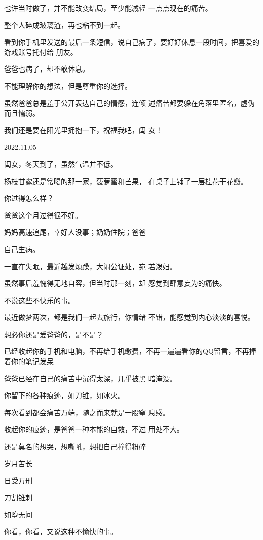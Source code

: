 \documentclass{article}
\begin{document}
也许当时做了，并不能改变结局，至少能减轻
一点点现在的痛苦。 


整个人碎成玻璃渣，再也粘不到一起。 

看到你手机里发送的最后一条短信，说自己病了，要好好休息一段时间，把喜爱的游戏账号托付给
朋友。 


爸爸也病了，却不敢休息。 

\newpage


不能理解你的想法，但是尊重你的选择。 

虽然爸爸总是羞于公开表达自己的情感，连倾
述痛苦都要躲在角落里匿名，虚伪而且懦弱。 

我们还是要在阳光里拥抱一下，祝福我吧，闺
女！ 



2022.11.05 


闺女，冬天到了，虽然气温并不低。 

杨枝甘露还是常喝的那一家，菠萝蜜和芒果，
在桌子上铺了一层桂花干花瓣。 


你过得怎么样？ 


爸爸这个月过得很不好。 

妈妈高速追尾，幸好人没事；奶奶住院；爸爸
\newpage

自己生病。 

一直在失眠，最近越发烦躁，大闹公证处，宛
若泼妇。 

虽然事后羞愧得无地自容，但当时那一刻，却
感觉到肆意妄为的痛快。 


不说这些不快乐的事。 

最近做梦两次，都是我们一起去旅行，你情绪
不错，能感觉到内心淡淡的喜悦。 


想必你还是爱爸爸的，是不是？ 

已经收起你的手机和电脑，不再给手机缴费，不再一遍遍看你的QQ留言，不再捧着你的笔记发呆

爸爸已经在自己的痛苦中沉得太深，几乎被黑
暗淹没。 

\newpage


你留下的各种痕迹，如刀锥，如冰火。 

每次看到都会痛苦万端，随之而来就是一股窒
息感。 

收起你的痕迹，是爸爸一种本能的自救，不过
用处不大。 

还是莫名的想哭，想嘶吼，想把自己撞得粉碎


岁月苦长 


日受万刑 


刀割锥刺 


如堕无间 


你看，你看，又说这种不愉快的事。 
\end{document}
